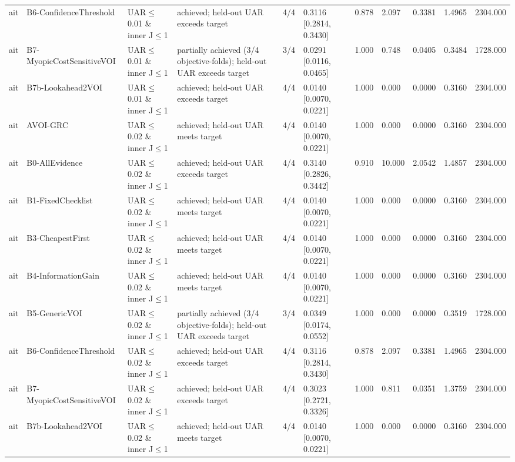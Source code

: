 \begin{table}[!ht]
{\begin{tabular}{lllllllllll}
ait & B6-ConfidenceThreshold & UAR$\le$0.01 \& inner J$\le$1 & achieved; held-out UAR exceeds target & 4/4 & 0.3116 [0.2814, 0.3430] & 0.878 & 2.097 & 0.3381 & 1.4965 & 2304.000 \\
ait & B7-MyopicCostSensitiveVOI & UAR$\le$0.01 \& inner J$\le$1 & partially achieved (3/4 objective-folds); held-out UAR exceeds target & 3/4 & 0.0291 [0.0116, 0.0465] & 1.000 & 0.748 & 0.0405 & 0.3484 & 1728.000 \\
ait & B7b-Lookahead2VOI & UAR$\le$0.01 \& inner J$\le$1 & achieved; held-out UAR exceeds target & 4/4 & 0.0140 [0.0070, 0.0221] & 1.000 & 0.000 & 0.0000 & 0.3160 & 2304.000 \\
ait & AVOI-GRC & UAR$\le$0.02 \& inner J$\le$1 & achieved; held-out UAR meets target & 4/4 & 0.0140 [0.0070, 0.0221] & 1.000 & 0.000 & 0.0000 & 0.3160 & 2304.000 \\
ait & B0-AllEvidence & UAR$\le$0.02 \& inner J$\le$1 & achieved; held-out UAR exceeds target & 4/4 & 0.3140 [0.2826, 0.3442] & 0.910 & 10.000 & 2.0542 & 1.4857 & 2304.000 \\
ait & B1-FixedChecklist & UAR$\le$0.02 \& inner J$\le$1 & achieved; held-out UAR meets target & 4/4 & 0.0140 [0.0070, 0.0221] & 1.000 & 0.000 & 0.0000 & 0.3160 & 2304.000 \\
ait & B3-CheapestFirst & UAR$\le$0.02 \& inner J$\le$1 & achieved; held-out UAR meets target & 4/4 & 0.0140 [0.0070, 0.0221] & 1.000 & 0.000 & 0.0000 & 0.3160 & 2304.000 \\
ait & B4-InformationGain & UAR$\le$0.02 \& inner J$\le$1 & achieved; held-out UAR meets target & 4/4 & 0.0140 [0.0070, 0.0221] & 1.000 & 0.000 & 0.0000 & 0.3160 & 2304.000 \\
ait & B5-GenericVOI & UAR$\le$0.02 \& inner J$\le$1 & partially achieved (3/4 objective-folds); held-out UAR exceeds target & 3/4 & 0.0349 [0.0174, 0.0552] & 1.000 & 0.000 & 0.0000 & 0.3519 & 1728.000 \\
ait & B6-ConfidenceThreshold & UAR$\le$0.02 \& inner J$\le$1 & achieved; held-out UAR exceeds target & 4/4 & 0.3116 [0.2814, 0.3430] & 0.878 & 2.097 & 0.3381 & 1.4965 & 2304.000 \\
ait & B7-MyopicCostSensitiveVOI & UAR$\le$0.02 \& inner J$\le$1 & achieved; held-out UAR exceeds target & 4/4 & 0.3023 [0.2721, 0.3326] & 1.000 & 0.811 & 0.0351 & 1.3759 & 2304.000 \\
ait & B7b-Lookahead2VOI & UAR$\le$0.02 \& inner J$\le$1 & achieved; held-out UAR meets target & 4/4 & 0.0140 [0.0070, 0.0221] & 1.000 & 0.000 & 0.0000 & 0.3160 & 2304.000 \\

\end{tabular}}
\end{table}
